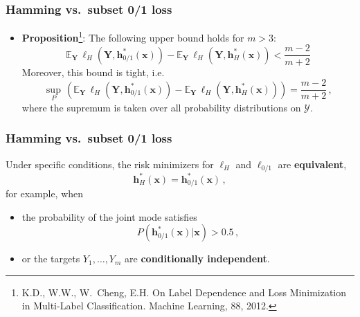 \documentclass[]{beamer}
\renewcommand{\Pr}{P}
\renewcommand{\vec}[1]{\boldsymbol{#1}}
\newcommand{\given}{\, | \,}
\newcommand{\loss}{L}
\newcommand{\ZO}{0/1 }
\newcommand{\bx}{\boldsymbol{x}}
\newcommand{\bh}{\boldsymbol{h}}
\newcommand{\bY}{\boldsymbol{Y}}
\renewcommand{\emph}[1]{\textbf{\color{putblue}#1}}
\begin{document}
\begin{frame}
\frametitle{Hamming vs.\ subset 0/1 loss}

\begin{itemize}
\item \emph{Proposition}\footnote{K.D., W.W., W.\ Cheng, E.H. On Label Dependence and Loss Minimization in Multi-Label Classification. Machine Learning, 88, 2012.}:
The following upper bound holds for $m > 3$:
$$
\mathbb{E}_{\mathbf{Y}} \, \ell_H(\mathbf{Y}, \mathbf{h}^*_{0/1}(\vec{x})) - \mathbb{E}_{\mathbf{Y}} \, \ell_H(\mathbf{Y}, \mathbf{h}^*_H(\vec{x}))
< \frac{m-2}{m+2}
$$
Moreover, this bound is tight, i.e.
$$
\sup_{\Pr} \, (\mathbb{E}_{\mathbf{Y}} \, \ell_H(\mathbf{Y}, \mathbf{h}^*_{0/1}(\vec{x})) - \mathbb{E}_{\mathbf{Y}}  \, \ell_H(\mathbf{Y}, \mathbf{h}^*_H(\vec{x})))
= \frac{m-2}{m+2}\,,
$$
where the supremum is taken over all probability distributions on $\mathcal{Y}$.
\end{itemize}
\end{frame}


\begin{frame}
\frametitle{Hamming vs.\ subset 0/1 loss}

Under specific conditions, the risk minimizers for $\ell_H$ %
and $\ell_{\ZO}$ %
are \emph{equivalent}, 
$$\bh^*_H(\bx) = \bh^*_{\ZO}(\bx) \,,$$
for example, when

\medskip

\begin{itemize}
\item the probability of the {joint mode} satisfies
$$
\Pr(\bh^*_{\ZO}(\bx)|\bx) > 0.5\, ,
$$
\item or the targets $Y_1, \ldots, Y_m$ are \emph{conditionally independent}.
\end{itemize}

\end{frame}
\end{document}
